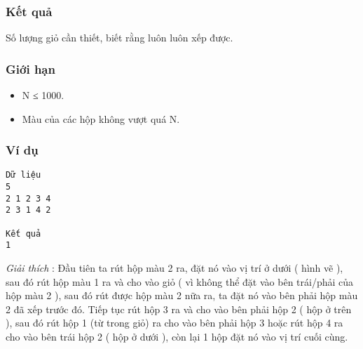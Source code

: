 \subsubsection{   Kết quả  }

   Số lượng giỏ cần thiết, biết rằng luôn luôn xếp được.  

\subsubsection{   Giới hạn  }
\begin{itemize}
	\item     N ≤ 1000.   
	\item     Màu của các hộp không vượt quá N.   
\end{itemize}

\subsubsection{   Ví dụ  }
\begin{verbatim}
Dữ liệu
5
2 1 2 3 4
2 3 1 4 2

Kết quả
1
\end{verbatim}

\textit{    Giải thích   }   : Đầu tiên ta rút hộp màu 2 ra, đặt nó vào vị   trí ở dưới ( hình vẽ ), sau đó rút hộp màu 1 ra và cho vào giỏ ( vì không thể đặt vào bên trái/phải của hộp màu 2 ), sau đó rút được hộp màu 2 nữa ra, ta đặt nó vào bên phải hộp màu 2 đã xếp trước đó. Tiếp tục rút hộp 3 ra và cho vào bên phải hộp 2 ( hộp ở trên ), sau đó rút hộp 1 (từ trong giỏ) ra cho vào bên phải hộp 3 hoặc rút hộp 4 ra cho vào bên trái hộp 2 ( hộp ở dưới ), còn lại 1 hộp đặt nó vào vị trí cuối cùng.  
